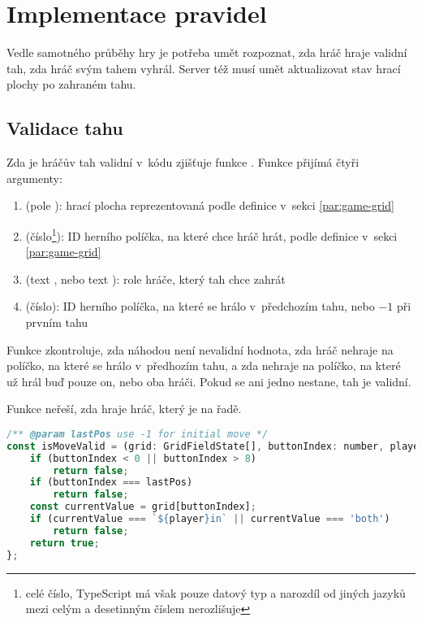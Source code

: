 \section{Implementace pravidel}\label{sec:rules-implementation}

Vedle samotného průběhy hry je potřeba umět rozpoznat, zda hráč hraje validní
tah, zda hráč svým tahem vyhrál. Server též musí umět aktualizovat stav hrací
plochy po zahraném tahu.

\subsection{Validace tahu}
Zda je hráčův tah validní v~kódu zjišťuje funkce . Funkce
přijímá čtyři argumenty:
\begin{enumerate}
    \item {} (pole ): hrací plocha reprezentovaná podle
        definice v~sekci \ref{par:game-grid}
    \item {} (číslo\footnote{celé číslo, TypeScript má však pouze
        datový typ  a narozdíl od jiných jazyků mezi celým a
        desetinným číslem nerozlišuje}): ID herního políčka, na které chce hráč
        hrát, podle definice v~sekci \ref{par:game-grid}
    \item {} (text , nebo text ): role hráče,
        který tah chce zahrát
    \item {} (číslo): ID herního políčka, na které se hrálo
v~předchozím tahu, nebo $-1$ při prvním tahu
\end{enumerate}

Funkce zkontroluje, zda  náhodou není nevalidní hodnota, zda
hráč nehraje na políčko, na které se hrálo v~předhozím tahu, a zda nehraje na
políčko, na které už hrál buď pouze on, nebo oba hráči. Pokud se ani jedno
nestane, tah je validní.

Funkce neřeší, zda hraje hráč, který je na řadě.

\begin{lstlisting}[language=JavaScript,caption={Funkce \M{isMoveValid}},label={lst:is-move-valid}]
/** @param lastPos use -1 for initial move */
const isMoveValid = (grid: GridFieldState[], buttonIndex: number, player: 'player1' | 'player2', lastPos: number) => {
    if (buttonIndex < 0 || buttonIndex > 8)
        return false;
    if (buttonIndex === lastPos)
        return false;
    const currentValue = grid[buttonIndex];
    if (currentValue === `${player}in` || currentValue === 'both')
        return false;
    return true;
};
\end{lstlisting}

